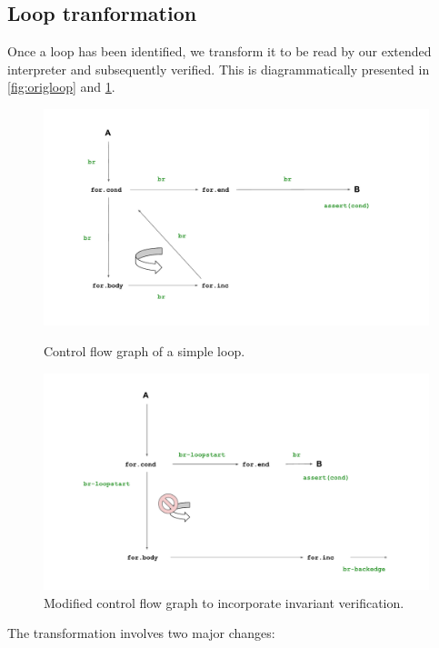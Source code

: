 \documentclass[11pt,a4paper,runningheads]{llncs}
\begin{document}
\subsection{Loop tranformation}
\label{subsec:looptransform}
%
Once a loop has been identified, we transform it to be read by our extended
interpreter and subsequently verified. This is diagrammatically presented in
\autoref{fig:origloop} and \ref{fig:modloop}.

\begin{figure}[!ht]
    \includegraphics[width=\textwidth]{fig/original_loop.pdf}
    \caption[Loop CFG]{Control flow graph of a simple loop.}
    \label{fig:origloop}
    
    \includegraphics[width=\textwidth]{fig/modified_loop.pdf}
    \caption[Changed CFG]{Modified control flow graph to incorporate invariant verification.}
    \label{fig:modloop}
\end{figure}

The transformation involves two major changes:
\end{document}
